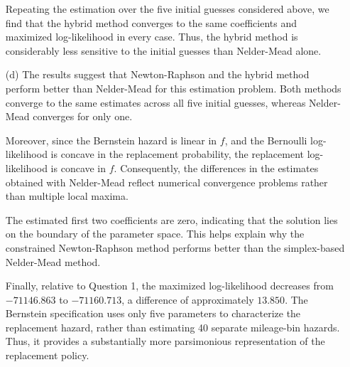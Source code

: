 \documentclass{article}
\begin{document}
\begin{enumerate}
    Repeating the estimation over the five initial guesses considered
    above, we find that the hybrid method converges to the same
    coefficients and maximized log-likelihood in every case.
    Thus, the hybrid method is considerably less sensitive to the
    initial guesses than Nelder-Mead alone.

    \item[(d)]
    The results suggest that Newton-Raphson and the hybrid method
    perform better than Nelder-Mead for this estimation problem.
    Both methods converge to the same estimates across all five
    initial guesses, whereas Nelder-Mead converges for only one.

    Moreover, since the Bernstein hazard is linear in $f$, and the
    Bernoulli log-likelihood is concave in the replacement probability,
    the replacement log-likelihood is concave in $f$. Consequently,
    the differences in the estimates obtained with Nelder-Mead
    reflect numerical convergence problems rather than multiple
    local maxima.

    The estimated first two coefficients are zero, indicating that
    the solution lies on the boundary of the parameter space.
    This helps explain why the constrained Newton-Raphson method
    performs better than the simplex-based Nelder-Mead method.

    Finally, relative to Question 1, the maximized log-likelihood
    decreases from $-71146.863$ to $-71160.713$, a difference of
    approximately $13.850$. The Bernstein specification uses only
    five parameters to characterize the replacement hazard, rather
    than estimating 40 separate mileage-bin hazards. Thus, it
    provides a substantially more parsimonious representation
    of the replacement policy.
\end{enumerate}
\end{document}
